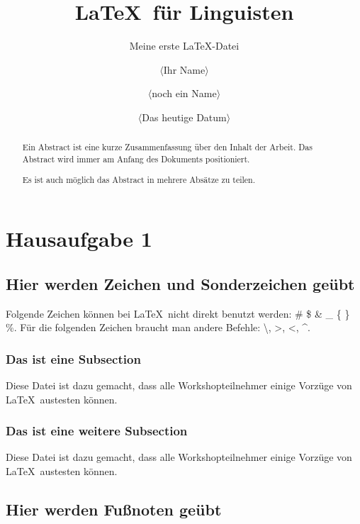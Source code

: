 \documentclass[10pt,paper=a4,abstracton]{scrartcl}
\author{$\langle$Ihr Name$\rangle$ \and $\langle$noch ein Name$\rangle$}
\title{\LaTeX\ für Linguisten}
\subtitle{Meine erste \LaTeX -Datei}
\date{$\langle$Das heutige Datum$\rangle$}
\begin{document}
\maketitle

\begin{abstract}
	Ein Abstract ist eine kurze Zusammenfassung über den Inhalt 
	der Arbeit. Das Abstract wird immer am Anfang des Dokuments 
	positioniert.\par
	Es ist auch möglich das Abstract in mehrere Absätze
	zu teilen.
\end{abstract}

\tableofcontents

\listoffigures

\listoftables


\section{Hausaufgabe 1}


\subsection[Zeichen und Sonderzeichen]{Hier werden Zeichen und Sonderzeichen geübt}

Folgende Zeichen können bei \LaTeX\ nicht direkt benutzt werden: \# \$ \& \_ \{ \} \%. Für die folgenden Zeichen braucht man andere Befehle: \textbackslash, \textgreater , \textless , \textasciicircum .


\subsubsection[Erste Subsection]{Das ist eine Subsection}

Diese Datei ist dazu gemacht, dass alle Workshopteilnehmer einige Vorzüge von \LaTeX\ austesten können.


\subsubsection[Zweite Subsection]{Das ist eine weitere Subsection}

Diese Datei ist dazu gemacht, dass alle Workshopteilnehmer einige Vorzüge von \LaTeX\ austesten können.


\subsection[Fußnoten]{Hier werden Fußnoten geübt}
\end{document}
